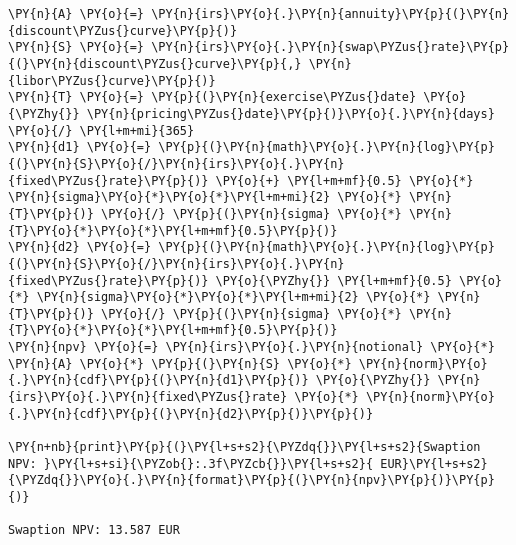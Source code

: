 \begin{Answer}
\begin{tcolorbox}[size=fbox, boxrule=1pt, colback=cellbackground, colframe=cellborder]
\begin{Verbatim}[commandchars=\\\{\}]
\PY{n}{A} \PY{o}{=} \PY{n}{irs}\PY{o}{.}\PY{n}{annuity}\PY{p}{(}\PY{n}{discount\PYZus{}curve}\PY{p}{)}
\PY{n}{S} \PY{o}{=} \PY{n}{irs}\PY{o}{.}\PY{n}{swap\PYZus{}rate}\PY{p}{(}\PY{n}{discount\PYZus{}curve}\PY{p}{,} \PY{n}{libor\PYZus{}curve}\PY{p}{)}
\PY{n}{T} \PY{o}{=} \PY{p}{(}\PY{n}{exercise\PYZus{}date} \PY{o}{\PYZhy{}} \PY{n}{pricing\PYZus{}date}\PY{p}{)}\PY{o}{.}\PY{n}{days} \PY{o}{/} \PY{l+m+mi}{365}
\PY{n}{d1} \PY{o}{=} \PY{p}{(}\PY{n}{math}\PY{o}{.}\PY{n}{log}\PY{p}{(}\PY{n}{S}\PY{o}{/}\PY{n}{irs}\PY{o}{.}\PY{n}{fixed\PYZus{}rate}\PY{p}{)} \PY{o}{+} \PY{l+m+mf}{0.5} \PY{o}{*} \PY{n}{sigma}\PY{o}{*}\PY{o}{*}\PY{l+m+mi}{2} \PY{o}{*} \PY{n}{T}\PY{p}{)} \PY{o}{/} \PY{p}{(}\PY{n}{sigma} \PY{o}{*} \PY{n}{T}\PY{o}{*}\PY{o}{*}\PY{l+m+mf}{0.5}\PY{p}{)}
\PY{n}{d2} \PY{o}{=} \PY{p}{(}\PY{n}{math}\PY{o}{.}\PY{n}{log}\PY{p}{(}\PY{n}{S}\PY{o}{/}\PY{n}{irs}\PY{o}{.}\PY{n}{fixed\PYZus{}rate}\PY{p}{)} \PY{o}{\PYZhy{}} \PY{l+m+mf}{0.5} \PY{o}{*} \PY{n}{sigma}\PY{o}{*}\PY{o}{*}\PY{l+m+mi}{2} \PY{o}{*} \PY{n}{T}\PY{p}{)} \PY{o}{/} \PY{p}{(}\PY{n}{sigma} \PY{o}{*} \PY{n}{T}\PY{o}{*}\PY{o}{*}\PY{l+m+mf}{0.5}\PY{p}{)}
\PY{n}{npv} \PY{o}{=} \PY{n}{irs}\PY{o}{.}\PY{n}{notional} \PY{o}{*} \PY{n}{A} \PY{o}{*} \PY{p}{(}\PY{n}{S} \PY{o}{*} \PY{n}{norm}\PY{o}{.}\PY{n}{cdf}\PY{p}{(}\PY{n}{d1}\PY{p}{)} \PY{o}{\PYZhy{}} \PY{n}{irs}\PY{o}{.}\PY{n}{fixed\PYZus{}rate} \PY{o}{*} \PY{n}{norm}\PY{o}{.}\PY{n}{cdf}\PY{p}{(}\PY{n}{d2}\PY{p}{)}\PY{p}{)}

\PY{n+nb}{print}\PY{p}{(}\PY{l+s+s2}{\PYZdq{}}\PY{l+s+s2}{Swaption NPV: }\PY{l+s+si}{\PYZob{}:.3f\PYZcb{}}\PY{l+s+s2}{ EUR}\PY{l+s+s2}{\PYZdq{}}\PY{o}{.}\PY{n}{format}\PY{p}{(}\PY{n}{npv}\PY{p}{)}\PY{p}{)}

Swaption NPV: 13.587 EUR
\end{Verbatim}
\end{tcolorbox}
\end{Answer}
